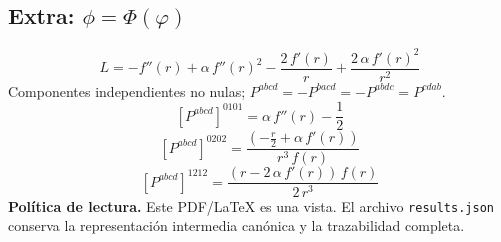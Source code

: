 \documentclass[11pt]{article}
\begin{document}
\subsection*{Extra: $\phi=\Phi\!\left(\varphi\right)$}
\begin{dmath*}[breakdepth={5}]
L=-f''\!\left(r\right) + \alpha\,{f''\!\left(r\right)}^{2} - \frac{2\,f'\!\left(r\right)}{r} + \frac{2\,\alpha\,{f'\!\left(r\right)}^{2}}{{r}^{2}}
\end{dmath*}
Componentes independientes no nulas; $P^{abcd}=-P^{bacd}=-P^{abdc}=P^{cdab}$.
\begin{dmath*}[breakdepth={5}]
\left[P^{abcd}\right]^{0101}=\alpha\,f''\!\left(r\right) - \frac{1}{2}
\end{dmath*}
\begin{dmath*}[breakdepth={5}]
\left[P^{abcd}\right]^{0202}=\frac{\left(-\frac{r}{2} + \alpha\,f'\!\left(r\right)\right)}{{r}^{3}\,f\!\left(r\right)}
\end{dmath*}
\begin{dmath*}[breakdepth={5}]
\left[P^{abcd}\right]^{1212}=\frac{\left(r - 2\,\alpha\,f'\!\left(r\right)\right)\,f\!\left(r\right)}{2\,{r}^{3}}
\end{dmath*}
\bigskip\noindent\textbf{Política de lectura.} Este PDF/LaTeX es una vista. El archivo \texttt{results.json} conserva la representación intermedia canónica y la trazabilidad completa.
\end{document}
